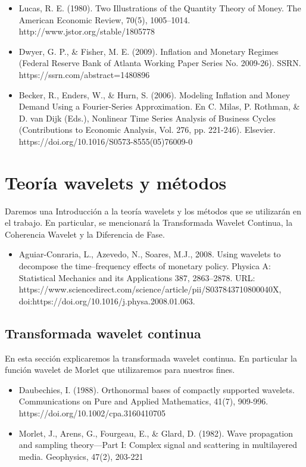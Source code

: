 \documentclass[a4paper,fleqn]{cas-sc}
\begin{document}
\begin{itemize}
    \item Lucas, R. E. (1980). Two Illustrations of the Quantity Theory of Money. The American Economic Review, 70(5), 1005–1014. http://www.jstor.org/stable/1805778
    \item Dwyer, G. P., \& Fisher, M. E. (2009). Inflation and Monetary Regimes (Federal Reserve Bank of Atlanta Working Paper Series No. 2009-26). SSRN. https://ssrn.com/abstract=1480896
    \item Becker, R., Enders, W., \& Hurn, S. (2006). Modeling Inflation and Money Demand Using a Fourier-Series Approximation. En C. Milas, P. Rothman, \& D. van Dijk (Eds.), Nonlinear Time Series Analysis of Business Cycles (Contributions to Economic Analysis, Vol. 276, pp. 221-246). Elsevier. https://doi.org/10.1016/S0573-8555(05)76009-0
\end{itemize}

\section{Teoría wavelets y métodos}
Daremos una Introducción a la teoría wavelets y los métodos que se utilizarán en el trabajo. En particular, se mencionará la Transformada Wavelet Continua, la Coherencia Wavelet y la Diferencia de Fase.

    \begin{itemize}
	\item Aguiar-Conraria, L., Azevedo, N., Soares, M.J., 2008. Using wavelets to decompose the time–frequency effects of monetary policy. Physica A: Statistical Mechanics and its Applications 387, 2863–2878. URL: https://www.sciencedirect.com/science/article/pii/S037843710800040X,\\ doi:https://doi.org/10.1016/j.physa.2008.01.063.
    \end{itemize}

\subsection{Transformada wavelet continua}
En esta sección explicaremos la transformada wavelet continua. En particular la función wavelet de Morlet que utilizaremos para nuestros fines. 
	\begin{itemize}
	    \item Daubechies, I. (1988). Orthonormal bases of compactly supported wavelets. Communications on Pure and Applied Mathematics, 41(7), 909-996. https://doi.org/10.1002/cpa.3160410705
	    \item Morlet, J., Arens, G., Fourgeau, E., \& Glard, D. (1982). Wave propagation and sampling theory—Part I: Complex signal and scattering in multilayered media. Geophysics, 47(2), 203-221
	\end{itemize}
\end{document}
